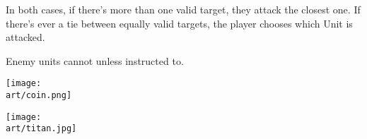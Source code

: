 \begin{multicols}{2}
In both cases, if there's more than one valid target, they attack the closest one.
If there's ever a tie between equally valid targets, the player chooses which Unit is attacked.\par

Enemy units cannot  unless instructed to.

\vfill

\centering
\texttt{[image: \\art/coin.png]}

\begin{center}
    \texttt{[image: \\art/titan.jpg]}
\end{center}

\end{multicols}
